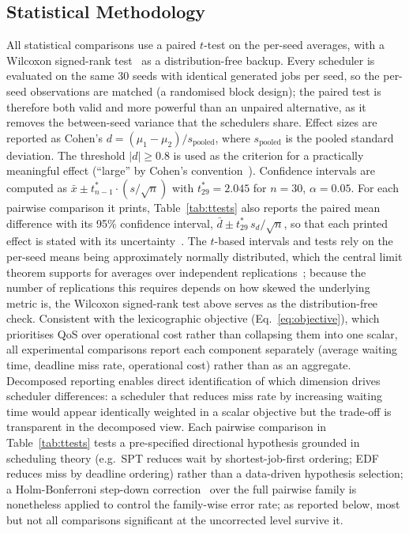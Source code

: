 {\subsection{Statistical Methodology}
\label{ssec:statistical-methodology}

All statistical comparisons use a paired $t$-test on the per-seed averages, with a Wilcoxon signed-rank test~\cite{wilcoxon1945individual} as a distribution-free backup. Every scheduler is evaluated on the same 30 seeds with identical generated jobs per seed, so the per-seed observations are matched (a randomised block design); the paired test is therefore both valid and more powerful than an unpaired alternative, as it removes the between-seed variance that the schedulers share. Effect sizes are reported as Cohen's $d = (\mu_1 - \mu_2) / s_{\text{pooled}}$, where $s_{\text{pooled}}$ is the pooled standard deviation. The threshold $|d| \geq 0.8$ is used as the criterion for a practically meaningful effect (``large'' by Cohen's convention~\cite{cohen1988statistical}). Confidence intervals are computed as $\bar{x} \pm t^*_{n-1} \cdot (s/\sqrt{n})$ with $t^*_{29} = 2.045$ for $n=30$, $\alpha=0.05$. For each pairwise comparison it prints, Table~\ref{tab:ttests} also reports the paired mean difference with its 95\% confidence interval, $\bar{d} \pm t^*_{29}\, s_d/\sqrt{n}$, so that each printed effect is stated with its uncertainty~\cite{kalibera2020quantifying,krishnamachari2026statistical}. The $t$-based intervals and tests rely on the per-seed means being approximately normally distributed, which the central limit theorem supports for averages over independent replications~\cite{law2000simulation}; because the number of replications this requires depends on how skewed the underlying metric is, the Wilcoxon signed-rank test above serves as the distribution-free check. Consistent with the lexicographic objective (Eq.~\ref{eq:objective}), which prioritises QoS over operational cost rather than collapsing them into one scalar, all experimental comparisons report each component separately (average waiting time, deadline miss rate, operational cost) rather than as an aggregate. Decomposed reporting enables direct identification of which dimension drives scheduler differences: a scheduler that reduces miss rate by increasing waiting time would appear identically weighted in a scalar objective but the trade-off is transparent in the decomposed view. Each pairwise comparison in Table~\ref{tab:ttests} tests a pre-specified directional hypothesis grounded in scheduling theory (e.g.\ SPT reduces wait by shortest-job-first ordering; EDF reduces miss by deadline ordering) rather than a data-driven hypothesis selection; a Holm-Bonferroni step-down correction~\cite{holm1979simple} over the full pairwise family is nonetheless applied to control the family-wise error rate; as reported below, most but not all comparisons significant at the uncorrected level survive it.

}
